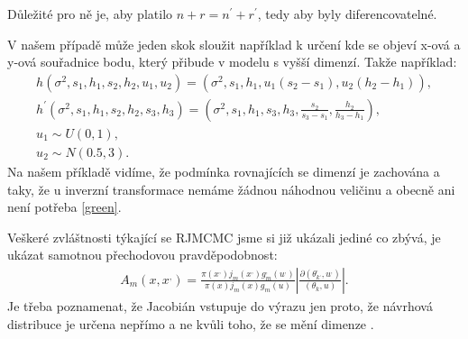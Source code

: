 \documentclass[czech,master,public,dept470,male,cpdeclaration,oneside, python]{diploma}
\begin{document}
Důležité pro ně je, aby platilo $n + r = n^{'} + r^{'}$, tedy aby byly diferencovatelné.

 V našem případě může jeden skok sloužit například k určení kde se objeví x-ová a y-ová souřadnice bodu, který přibude v modelu s vyšší dimenzí. Takže například:
\begin{align}
	h(\sigma^2, s_1, h_1, s_2, h_2, u_1, u_2) = (\sigma^2, s_1, h_1, u_1(s_2-s_1), u_2(h_2-h_1)), \\
	h^{'}(\sigma^2, s_1, h_1, s_2, h_2, s_3, h_3) = (\sigma^2, s_1, h_1, s_3, h_3, \frac{s_2}{s_3-s_1}, \frac{h_2}{h_3-h_1}), \\
	u_1 \sim U(0, 1), \\
	u_2 \sim N(0.5, 3).
\end{align}
Na našem příkladě vidíme, že podmínka rovnajících se dimenzí je zachována a taky, že u inverzní transformace nemáme žádnou náhodnou veličinu a obecně ani není potřeba \ref{green}. \par
Veškeré zvláštnosti týkající se RJMCMC jsme si již ukázali jediné co zbývá, je ukázat samotnou přechodovou pravděpodobnost:
\begin{align}\label{rjmcmc_probability}
	A_m(x, x^{,}) = \frac{\pi(x^{,})j_m(x^{,})g^{,}_m(u^{,})}{\pi(x)j_m(x)g_m(u)}
	| \frac{\partial(\theta^{,}_{k^{,}}, u^{,})}{(\theta_k, u)} |.
\end{align}
Je třeba poznamenat, že Jacobián vstupuje do výrazu jen proto, že návrhová distribuce je určena nepřímo a ne kvůli toho, že se mění dimenze \cite{green2009reversible}. 
\end{document}
